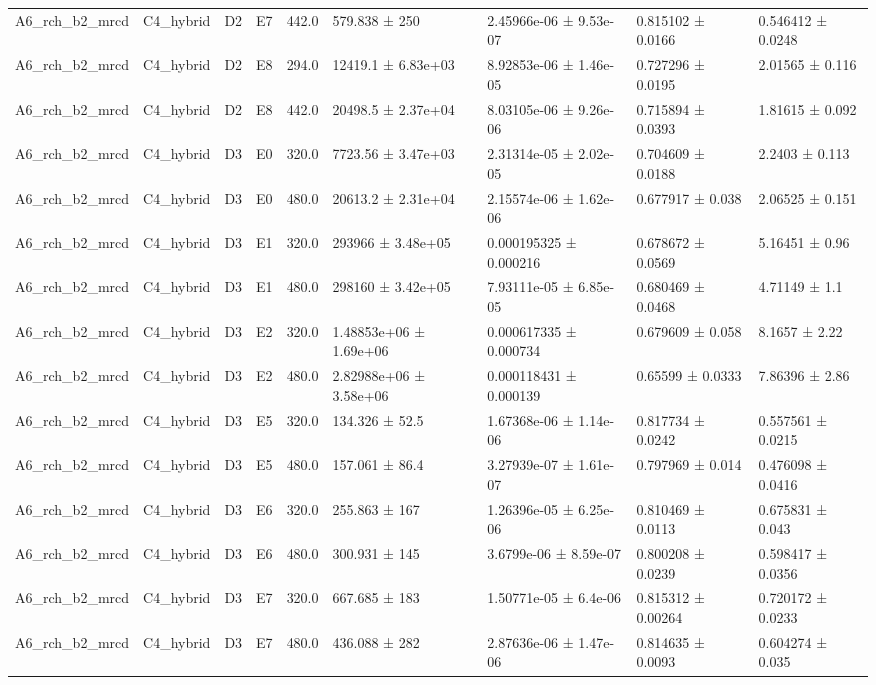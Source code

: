 \begin{table}
\begin{tabular}{lllllllll}
A6\_rch\_b2\_mrcd & C4\_hybrid & D2 & E7 & 442.0 & 579.838 ± 250 & 2.45966e-06 ± 9.53e-07 & 0.815102 ± 0.0166 & 0.546412 ± 0.0248 \\
A6\_rch\_b2\_mrcd & C4\_hybrid & D2 & E8 & 294.0 & 12419.1 ± 6.83e+03 & 8.92853e-06 ± 1.46e-05 & 0.727296 ± 0.0195 & 2.01565 ± 0.116 \\
A6\_rch\_b2\_mrcd & C4\_hybrid & D2 & E8 & 442.0 & 20498.5 ± 2.37e+04 & 8.03105e-06 ± 9.26e-06 & 0.715894 ± 0.0393 & 1.81615 ± 0.092 \\
A6\_rch\_b2\_mrcd & C4\_hybrid & D3 & E0 & 320.0 & 7723.56 ± 3.47e+03 & 2.31314e-05 ± 2.02e-05 & 0.704609 ± 0.0188 & 2.2403 ± 0.113 \\
A6\_rch\_b2\_mrcd & C4\_hybrid & D3 & E0 & 480.0 & 20613.2 ± 2.31e+04 & 2.15574e-06 ± 1.62e-06 & 0.677917 ± 0.038 & 2.06525 ± 0.151 \\
A6\_rch\_b2\_mrcd & C4\_hybrid & D3 & E1 & 320.0 & 293966 ± 3.48e+05 & 0.000195325 ± 0.000216 & 0.678672 ± 0.0569 & 5.16451 ± 0.96 \\
A6\_rch\_b2\_mrcd & C4\_hybrid & D3 & E1 & 480.0 & 298160 ± 3.42e+05 & 7.93111e-05 ± 6.85e-05 & 0.680469 ± 0.0468 & 4.71149 ± 1.1 \\
A6\_rch\_b2\_mrcd & C4\_hybrid & D3 & E2 & 320.0 & 1.48853e+06 ± 1.69e+06 & 0.000617335 ± 0.000734 & 0.679609 ± 0.058 & 8.1657 ± 2.22 \\
A6\_rch\_b2\_mrcd & C4\_hybrid & D3 & E2 & 480.0 & 2.82988e+06 ± 3.58e+06 & 0.000118431 ± 0.000139 & 0.65599 ± 0.0333 & 7.86396 ± 2.86 \\
A6\_rch\_b2\_mrcd & C4\_hybrid & D3 & E5 & 320.0 & 134.326 ± 52.5 & 1.67368e-06 ± 1.14e-06 & 0.817734 ± 0.0242 & 0.557561 ± 0.0215 \\
A6\_rch\_b2\_mrcd & C4\_hybrid & D3 & E5 & 480.0 & 157.061 ± 86.4 & 3.27939e-07 ± 1.61e-07 & 0.797969 ± 0.014 & 0.476098 ± 0.0416 \\
A6\_rch\_b2\_mrcd & C4\_hybrid & D3 & E6 & 320.0 & 255.863 ± 167 & 1.26396e-05 ± 6.25e-06 & 0.810469 ± 0.0113 & 0.675831 ± 0.043 \\
A6\_rch\_b2\_mrcd & C4\_hybrid & D3 & E6 & 480.0 & 300.931 ± 145 & 3.6799e-06 ± 8.59e-07 & 0.800208 ± 0.0239 & 0.598417 ± 0.0356 \\
A6\_rch\_b2\_mrcd & C4\_hybrid & D3 & E7 & 320.0 & 667.685 ± 183 & 1.50771e-05 ± 6.4e-06 & 0.815312 ± 0.00264 & 0.720172 ± 0.0233 \\
A6\_rch\_b2\_mrcd & C4\_hybrid & D3 & E7 & 480.0 & 436.088 ± 282 & 2.87636e-06 ± 1.47e-06 & 0.814635 ± 0.0093 & 0.604274 ± 0.035 \\

\end{tabular}
\end{table}
